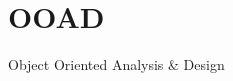 \section{OOAD}
\begin{frame}
\begin{center}
\huge
Object Oriented Analysis & Design
\end{center}
\end{frame}